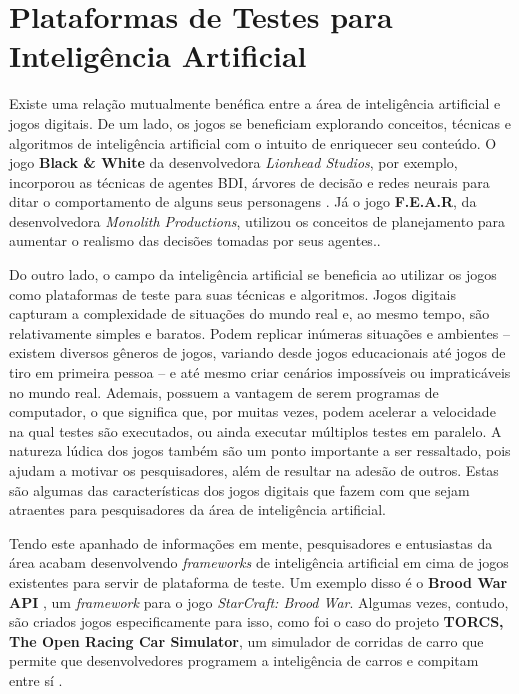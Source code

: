 \section{Plataformas de Testes para Inteligência Artificial}
Existe uma relação mutualmente benéfica entre a área de inteligência artificial
e jogos digitais.  De um lado, os jogos se beneficiam explorando conceitos,
técnicas e algoritmos de inteligência artificial com o intuito de enriquecer
seu conteúdo. O jogo \textbf{Black \& White} da desenvolvedora \textit{Lionhead
Studios}, por exemplo, incorporou as técnicas de agentes BDI, árvores de
decisão e redes neurais para ditar o comportamento de alguns seus personagens
\cite{TOPAIGAMES}.  Já o jogo \textbf{F.E.A.R}, da desenvolvedora
\textit{Monolith Productions}, utilizou os conceitos de planejamento para
aumentar o realismo das decisões tomadas por seus agentes.\cite{FEARPLANNING}.

Do outro lado, o campo da inteligência artificial se beneficia ao utilizar os
jogos como plataformas de teste para suas técnicas e algoritmos. Jogos digitais
capturam a complexidade de situações do mundo real e, ao mesmo tempo, são
relativamente simples e baratos. Podem replicar inúmeras situações e ambientes
-- existem diversos gêneros de jogos, variando desde jogos educacionais até
jogos de tiro em primeira pessoa -- e até mesmo criar cenários impossíveis ou
impraticáveis no mundo real. Ademais, possuem a vantagem de serem programas de
computador, o que significa que, por muitas vezes, podem acelerar a velocidade
na qual testes são executados, ou ainda executar múltiplos testes em paralelo.
A natureza lúdica dos jogos também são um ponto importante a ser ressaltado,
pois ajudam a motivar os pesquisadores, além de resultar na adesão de outros.
Estas são algumas das características dos jogos digitais que fazem com que
sejam atraentes para pesquisadores da área de inteligência artificial.

Tendo este apanhado de informações em mente, pesquisadores e entusiastas da área
acabam desenvolvendo \textit{frameworks} de inteligência artificial em cima de
jogos existentes para servir de plataforma de teste. Um exemplo disso é o
\textbf{Brood War API} \cite{BWAPI}, um \textit{framework} para o jogo
\textit{StarCraft: Brood War}. Algumas vezes, contudo, são criados jogos
especificamente para isso, como foi o caso do projeto \textbf{TORCS, The Open
Racing Car Simulator}, um simulador de corridas de carro que permite que
desenvolvedores programem a inteligência de carros e compitam entre sí
\cite{TORCSWEB}.

